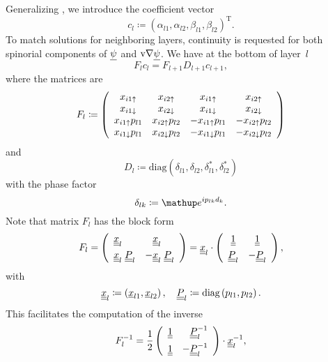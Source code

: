 Generalizing ,
we introduce the coefficient vector
\begin{equation}
  c_l \coloneqq  {(\alpha_{l1}, \alpha_{l2}, \beta_{l1}, \beta_{l2})}^\text{T}.
\end{equation}
To match solutions for neighboring layers,
continuity is requested for both spinorial components
of $\underline{\psi}$ and $\text{v}{\nabla}\underline{\psi}$.
We have at the bottom of layer~$l$
\begin{equation}\label{EFcFDcp}
  F_l c_l = F_{l+1} D_{l+1} c_{l+1},
\end{equation}
where the matrices are
\begin{equation}
  F_l \coloneqq  \left(\begin{array}{cccc}
    x_{i1\uparrow}      &x_{i2\uparrow}     &x_{i1\uparrow}       &x_{i2\uparrow}       \\
    x_{i1\downarrow}      &x_{i2\downarrow}     &x_{i1\downarrow}       &x_{i2\downarrow}       \\
    x_{i1\uparrow}p_{l1}&x_{i2\uparrow}p_{l2}&-x_{i1\uparrow}p_{l1}&-x_{i2\uparrow}p_{l2}\\
    x_{i1\downarrow}p_{l1}&x_{i2\downarrow}p_{l2}&-x_{i1\downarrow}p_{l1}&-x_{i2\downarrow}p_{l2}
  \end{array}\right)
\end{equation}
and
\begin{equation}
  D_l \coloneqq  \text{diag}(\delta_{l1}, \delta_{l2}, \delta_{l1}^*, \delta_{l2}^*)
\end{equation}
with the phase factor
\begin{equation}
   \delta_{l k} \coloneqq  \e^{ip_{l k}d_k}.
\end{equation}
Note that matrix $F_l$ has the block form
\begin{equation}
  F_l
  =\left(\begin{array}{ll}\underline{\underline{x}}_l&\hphantom{-}\underline{\underline{x}}_l\\[1ex]
    \underline{\underline{x}}_l\; \underline{\underline{P}}_l&-\underline{\underline{x}}_l\; \underline{\underline{P}}_l\end{array}\right)
    = \underline{\underline{x}}_l \cdot
    \left(\begin{array}{cc}\underline{\underline{1}}&\underline{\underline{1}}\\[1ex]
    \underline{\underline{P}}_l&-\underline{\underline{P}}_l\end{array}\right),
\end{equation}
with
\begin{equation}
  \underline{\underline{x}}_l \coloneqq
  \left(\underline{x}_{l1}, \underline{x}_{l2}\right),
  \quad
  \underline{\underline{P}}_l \coloneqq
  \text{diag}\left(p_{l1},p_{l2}\right).
\end{equation}
This facilitates the computation of the inverse
\begin{equation}
  F_l^{-1}
    = \frac{1}{2}
    \left(\begin{array}{cc}\underline{\underline{1}}&\hphantom{-}\underline{\underline{P}}_l^{-1}\\[1.2ex]
      \underline{\underline{1}} &-\underline{\underline{P}}_l^{-1}\end{array}\right)
      \cdot\underline{\underline{x}}_l^{-1},
\end{equation}
